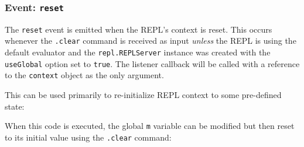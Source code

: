 \subsubsection{\texorpdfstring{Event:
\texttt{\textquotesingle{}reset\textquotesingle{}}}{Event: \textquotesingle reset\textquotesingle{}}}\label{event-reset}

The \texttt{\textquotesingle{}reset\textquotesingle{}} event is emitted
when the REPL's context is reset. This occurs whenever the
\texttt{.clear} command is received as input \emph{unless} the REPL is
using the default evaluator and the \texttt{repl.REPLServer} instance
was created with the \texttt{useGlobal} option set to \texttt{true}. The
listener callback will be called with a reference to the
\texttt{context} object as the only argument.

This can be used primarily to re-initialize REPL context to some
pre-defined state:

\begin{Shaded}
\begin{Highlighting}[]
\OperatorTok{=} \NormalTok{(}\NormalTok{)}\OperatorTok{;}

 
 \OperatorTok{=} \OperatorTok{;}
\NormalTok{\}}

\OperatorTok{=}\NormalTok{(\{ }\OperatorTok{:} \StringTok{\textquotesingle{}\textgreater{} \textquotesingle{}}\NormalTok{ \})}\OperatorTok{;}
\NormalTok{)}\OperatorTok{;}

\NormalTok{(}\OperatorTok{,}\OperatorTok{;}
\end{Highlighting}
\end{Shaded}

When this code is executed, the global
\texttt{\textquotesingle{}m\textquotesingle{}} variable can be modified
but then reset to its initial value using the \texttt{.clear} command:

\begin{Shaded}
\begin{Highlighting}[]
\NormalTok{\textgreater{}}
\end{Highlighting}
\end{Shaded}

